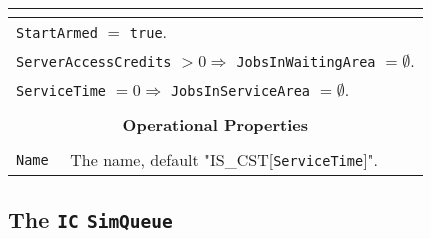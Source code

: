 \documentclass[12pt]{book}
\begin{document}
\begin{tabular}{|l|l|l|l|}
\multicolumn{4}{|c|}{} \\
\hline
\multicolumn{4}{|l|}{\lstinline|StartArmed| $=$ \lstinline|true|.} \\
\multicolumn{4}{|l|}{\lstinline|ServerAccessCredits| $> 0 \Rightarrow$ \lstinline|JobsInWaitingArea| $= \emptyset$.} \\
\multicolumn{4}{|l|}{\lstinline|ServiceTime| $= 0 \Rightarrow$ \lstinline|JobsInServiceArea| $= \emptyset$.} \\
\hline
\multicolumn{4}{|c|}{} \\
\multicolumn{4}{|c|}{\bf Operational Properties} \\
\multicolumn{4}{|c|}{} \\
\hline
\lstinline|Name| & \multicolumn{3}{|l|}{The name, default "IS\_CST[\lstinline|ServiceTime|]".} \\
\hline
\end{tabular}

\subsection{The \lstinline{IC} \lstinline{SimQueue}}
\end{document}

